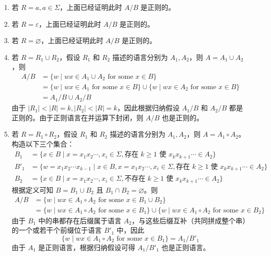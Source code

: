 \documentclass[11pt,addpoints,answers]{exam}
\begin{document}
\begin{questions}
\begin{solution}
\begin{enumerate}
\item 若 \(R = a, a \in \Sigma\)，上面已经证明此时 \(A/B\) 是正则的。

\item 若 \(R = \varepsilon\)，上面已经证明此时 \(A/B\) 是正则的。

\item 若 \(R = \varnothing\)，上面已经证明此时 \(A/B\) 是正则的。

\item 若 \(R = R_1 \cup R_2\)，假设 \(R_1\) 和 \(R_2\) 描述的语言分别为 \(A_1, A_2\)，则 \(A = A_1 \cup A_2\)，则
\[
\begin{aligned}
A/B &= \{w \mid wx \in A_1 \cup A_2 \text{ for some } x \in B\} \\
&= \{w \mid wx \in A_1 \text{ for some } x \in B\} \cup \{w \mid wx \in A_2 \text{ for some } x \in B\} \\
&= A_1/B \cup A_2/B
\end{aligned}
\tag{11.4}
\]
由于 \(|R_1| < |R| = k, |R_2| < |R| = k\)，因此根据归纳假设 \(A_1/B\) 和 \(A_2/B\) 都是正则的。由于正则语言在并运算下封闭，则 \(A/B\) 也是正则的。

\item 若 \(R = R_1 \circ R_2\)，假设 \(R_1\) 和 \(R_2\) 描述的语言分别为 \(A_1, A_2\)，则 \(A = A_1 \circ A_2\)。构造以下三个集合：
\[
\begin{aligned}
B_1 &= \{x \in B \mid x = x_1 x_2 \cdots, x_i \in \Sigma, \text{存在 } k \geq 1 \text{ 使 } x_k x_{k+1} \cdots \in A_2\} \\
B'_1 &= \{w = x_1 x_2 \cdots x_{k-1} \mid x \in B, x = x_1 x_2 \cdots, x_i \in \Sigma, \text{存在 } k \geq 1 \text{ 使 } x_k x_{k+1} \cdots \in A_2\} \\
B_2 &= \{x \in B \mid x = x_1 x_2 \cdots, x_i \in \Sigma, \text{不存在 } k \geq 1 \text{ 使 } x_k x_{k+1} \cdots \in A_2\}
\end{aligned}
\tag{11.5}
\]
根据定义可知 \(B = B_1 \cup B_2\) 且 \(B_1 \cap B_2 = \varnothing\)。则
\[
\begin{aligned}
A/B &= \{w \mid wx \in A_1 \circ A_2 \text{ for some } x \in B_1 \cup B_2\} \\
&= \{w \mid wx \in A_1 \circ A_2 \text{ for some } x \in B_1\} \cup \{w \mid wx \in A_1 \circ A_2 \text{ for some } x \in B_2\}
\end{aligned}
\tag{11.6}
\]
由于 \(B_1\) 中的串都存在后缀属于语言 \(A_2\)，与这些后缀互补（共同拼成整个串）的一个或若干个前缀位于语言 \(B'_1\) 中，因此
\[
\{w \mid wx \in A_1 \circ A_2 \text{ for some } x \in B_1\} = A_1/B'_1
\tag{11.7}
\]
由于 \(A_1\) 是正则语言，根据归纳假设可得 \(A_1/B'_1\) 也是正则语言。


\end{enumerate}
\end{solution}
\end{questions}
\end{document}
